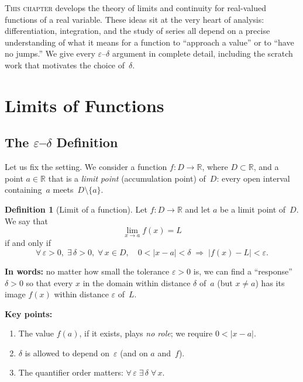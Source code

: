 \documentclass[12pt,a4paper,openany]{book}
\theoremstyle{definition}
\newtheorem{definition}{Definition}[chapter]
\theoremstyle{remark}
\begin{document}
\minitoc\bigskip

\lettrine[lines=3,lhang=0.15]{T}{his chapter} develops the theory of
limits and continuity for real-valued functions of a real variable.
These ideas sit at the very heart of analysis: differentiation,
integration, and the study of series all depend on a precise
understanding of what it means for a function to ``approach a value''
or to ``have no jumps.''  We give every $\varepsilon$--$\delta$
argument in complete detail, including the scratch work that motivates
the choice of~$\delta$.

\section{Limits of Functions}

\subsection{The \texorpdfstring{$\varepsilon$--$\delta$}{epsilon--delta}
  Definition}

Let us fix the setting.  We consider a function
$f\colon D\to\mathbb{R}$, where $D\subset\mathbb{R}$, and a point
$a\in\mathbb{R}$ that is a \emph{limit point} (accumulation point)
of~$D$: every open interval containing~$a$ meets~$D\setminus\{a\}$.

\begin{definition}[Limit of a function]\label{def:limit-function}
Let $f\colon D\to\mathbb{R}$ and let $a$ be a limit point of~$D$.
We say that
\[
  \lim_{x\to a} f(x)=L
\]
if and only if
\[
  \forall\,\varepsilon>0,\;\exists\,\delta>0,\;
  \forall\, x\in D,\quad
  0<|x-a|<\delta \;\Longrightarrow\; |f(x)-L|<\varepsilon.
\]
\end{definition}

\begin{tcolorbox}[colback=blue!3,colframe=blue!50!black,
  title={Reading the definition}]
\textbf{In words:} no matter how small the tolerance
$\varepsilon>0$ is, we can find a ``response'' $\delta>0$ so that
every $x$ in the domain within distance $\delta$ of~$a$ (but
$x\neq a$) has its image $f(x)$ within distance $\varepsilon$
of~$L$.

\medskip\noindent
\textbf{Key points:}
\begin{enumerate}[nosep]
\item The value $f(a)$, if it exists, plays \emph{no role}; we require
  $0<|x-a|$.
\item $\delta$ is allowed to depend on~$\varepsilon$ (and on $a$
  and~$f$).
\item The quantifier order matters:
  $\forall\,\varepsilon\;\exists\,\delta\;\forall\, x$.
\end{enumerate}
\end{tcolorbox}
\end{document}
